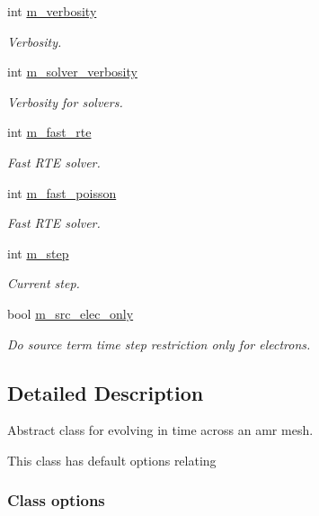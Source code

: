 \begin{DoxyCompactItemize}
int \hyperlink{classtime__stepper_a9af86e24658bec33326091ab5012a924}{m\+\_\+verbosity}
\begin{DoxyCompactList}\small\item\em Verbosity. \end{DoxyCompactList}\item 
int \hyperlink{classtime__stepper_a0f30ea8c9bc55972e9a28d9e5d4881f8}{m\+\_\+solver\+\_\+verbosity}
\begin{DoxyCompactList}\small\item\em Verbosity for solvers. \end{DoxyCompactList}\item 
int \hyperlink{classtime__stepper_ae6674f68d4df3b6b1d1f4700893d63e6}{m\+\_\+fast\+\_\+rte}
\begin{DoxyCompactList}\small\item\em Fast R\+TE solver. \end{DoxyCompactList}\item 
int \hyperlink{classtime__stepper_a8b9bbcec948740cc5de4fd749f7b1aca}{m\+\_\+fast\+\_\+poisson}
\begin{DoxyCompactList}\small\item\em Fast R\+TE solver. \end{DoxyCompactList}\item 
int \hyperlink{classtime__stepper_a5a4bd274325d52eef716b6c465cc3a9d}{m\+\_\+step}
\begin{DoxyCompactList}\small\item\em Current step. \end{DoxyCompactList}\item 
bool \hyperlink{classtime__stepper_a86913b145d2b6ad0442b6341e39f754d}{m\+\_\+src\+\_\+elec\+\_\+only}
\begin{DoxyCompactList}\small\item\em Do source term time step restriction only for electrons. \end{DoxyCompactList}\end{DoxyCompactItemize}


\subsection{Detailed Description}
Abstract class for evolving in time across an amr mesh. 

This class has default options relating

\subsubsection*{Class options }

